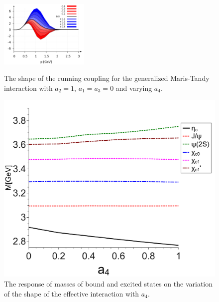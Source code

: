 \begin{figure}[!t]
  \begin{center}
    \includegraphics[width=0.38\textwidth]{figures/maris_a4}
    \caption{The shape of the running coupling for the generalized Maris-Tandy interaction with $a_2=1$, $a_1=a_3=0$ and varying $a_4$.}\label{fig:slope_a4}
  \end{center}
  \begin{center}
    \includegraphics[scale=0.25]{figures/trend_a4_CC} 
    \caption{The response of masses of bound and excited states on the variation of the shape of the effective interaction with $a_4$.}\label{fig:trend_a4}
  \end{center}
\end{figure}

